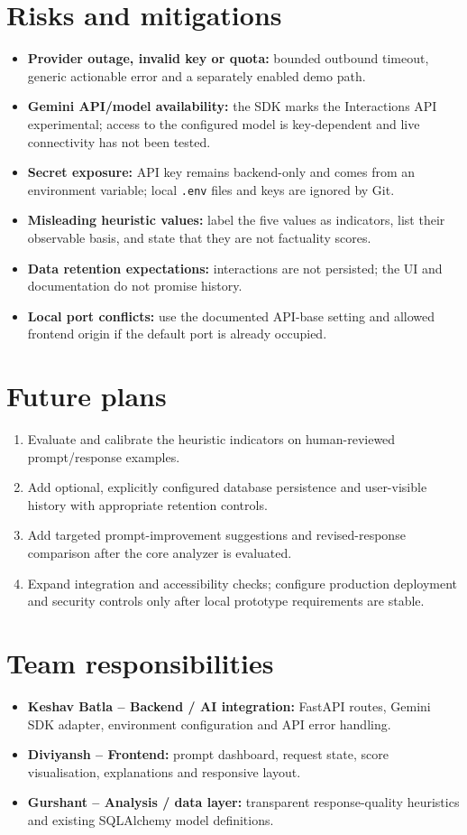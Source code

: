 \documentclass[11pt,a4paper]{article}
\begin{document}
\section{Risks and mitigations}
\begin{itemize}
  \item \textbf{Provider outage, invalid key or quota:} bounded outbound timeout, generic actionable error and a separately enabled demo path.
  \item \textbf{Gemini API/model availability:} the SDK marks the Interactions API experimental; access to the configured model is key-dependent and live connectivity has not been tested.
  \item \textbf{Secret exposure:} API key remains backend-only and comes from an environment variable; local \texttt{.env} files and keys are ignored by Git.
  \item \textbf{Misleading heuristic values:} label the five values as indicators, list their observable basis, and state that they are not factuality scores.
  \item \textbf{Data retention expectations:} interactions are not persisted; the UI and documentation do not promise history.
  \item \textbf{Local port conflicts:} use the documented API-base setting and allowed frontend origin if the default port is already occupied.
\end{itemize}

\section{Future plans}
\begin{enumerate}
  \item Evaluate and calibrate the heuristic indicators on human-reviewed prompt/response examples.
  \item Add optional, explicitly configured database persistence and user-visible history with appropriate retention controls.
  \item Add targeted prompt-improvement suggestions and revised-response comparison after the core analyzer is evaluated.
  \item Expand integration and accessibility checks; configure production deployment and security controls only after local prototype requirements are stable.
\end{enumerate}

\section{Team responsibilities}
\begin{itemize}
  \item \textbf{Keshav Batla -- Backend / AI integration:} FastAPI routes, Gemini SDK adapter, environment configuration and API error handling.
  \item \textbf{Diviyansh -- Frontend:} prompt dashboard, request state, score visualisation, explanations and responsive layout.
  \item \textbf{Gurshant -- Analysis / data layer:} transparent response-quality heuristics and existing SQLAlchemy model definitions.
\end{itemize}
\end{document}
